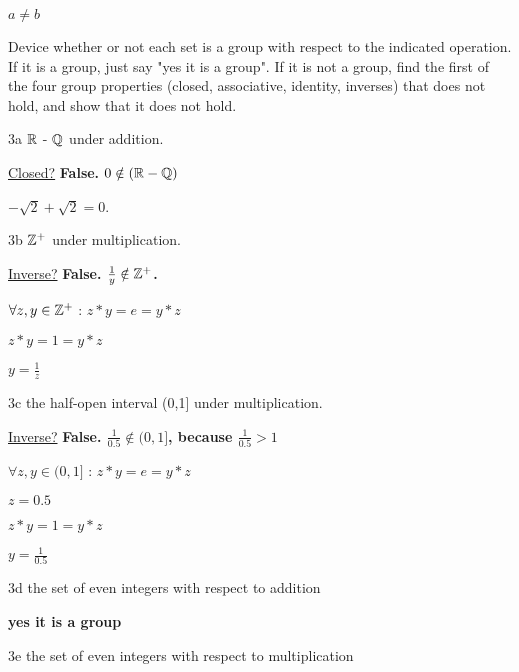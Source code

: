 $a\neq b$





\begin{question}{3}
Device whether or not each set is a group with respect to the indicated operation. If it is a group, just say "yes it is a group". If it is not a group, find the first of the four group properties (closed, associative, identity, inverses) that does not hold, and show that it does not hold.
\end{question}

\begin{question}{3a}
$\mathbb{R}$ - $\mathbb{Q}$ under addition.
\end{question}

\underline{Closed?} \textbf{False. $0 \notin (\mathbb{R}-\mathbb{Q})$}

$-\sqrt{2} + \sqrt{2} = 0$. 


\begin{question}{3b}
$\mathbb{Z}^+$ under multiplication.
\end{question}

\underline{Inverse?} \textbf{False. $\frac{1}{y} \notin \mathbb{Z}^+$.}

$\forall z,y \in \mathbb{Z}^+$ : $z * y = e = y * z$

$z * y = 1 = y * z$

$y = \frac{1}{z}$


\begin{question}{3c}
the half-open interval (0,1] under multiplication.
\end{question}

\underline{Inverse?} \textbf{False. $\frac{1}{0.5} \notin (0,1]$, because $\frac{1}{0.5} > 1$}

$\forall z,y \in (0,1]$ : $z * y = e = y * z$

$z=0.5$

$z * y = 1 = y * z$

$y = \frac{1}{0.5}$


\begin{question}{3d}
the set of even integers with respect to addition
\end{question}

\textbf{yes it is a group}

\begin{question}{3e}
the set of even integers with respect to multiplication
\end{question}

